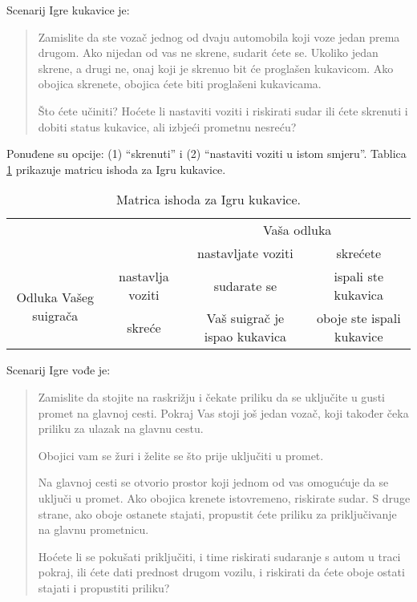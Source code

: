 \documentclass[a4paper, 12pt]{report}
\begin{document}
\begin{appendices}
Scenarij Igre kukavice je: 
\begin{quote}
Zamislite da ste vozač jednog od dvaju automobila koji voze jedan prema drugom.
Ako nijedan od vas ne skrene, sudarit ćete se. Ukoliko jedan skrene, a drugi ne,
onaj koji je skrenuo bit će proglašen kukavicom. Ako obojica skrenete, obojica
ćete biti proglašeni kukavicama.

Što ćete učiniti? Hoćete li nastaviti voziti i riskirati sudar ili ćete skrenuti
i dobiti status kukavice, ali izbjeći prometnu nesreću?
\end{quote}

Ponuđene su opcije: (1) \enquote{skrenuti} i (2) \enquote{nastaviti voziti u
    istom smjeru}. Tablica \ref{iktab} prikazuje matricu ishoda
za Igru kukavice. 

\begin{table}[h!]
\centering 
    \caption{Matrica ishoda za Igru kukavice. \label{iktab}}
\hspace*{-0.5cm}\begin{tabular}{cccc}
\toprule[1pt]
    & & \multicolumn{2}{c}{Vaša odluka}\\
        & & nastavljate voziti & skrećete\\
    \cmidrule[0.5pt]{3-4}
        \multirow{2}{*}{Odluka Vašeg suigrača} & nastavlja
            voziti & sudarate se & ispali ste kukavica  \\
        & skreće & Vaš suigrač je ispao kukavica & oboje ste
        ispali kukavice\\
	\bottomrule[1pt]
\end{tabular}
\end{table}

Scenarij Igre vođe je: 
\begin{quote}
Zamislite da stojite na raskrižju i čekate priliku da se
uključite u gusti promet na glavnoj cesti. Pokraj Vas stoji još jedan
vozač, koji također čeka priliku za ulazak na glavnu cestu. 

Obojici vam se žuri i želite se što prije uključiti u promet.

Na glavnoj cesti se otvorio prostor koji jednom od vas omogućuje da se uključi
u promet. Ako obojica krenete istovremeno, riskirate sudar. S druge strane, ako
oboje ostanete stajati, propustit ćete priliku za priključivanje na glavnu
prometnicu.

Hoćete li se pokušati priključiti, i time riskirati sudaranje s autom u traci
pokraj, ili ćete dati prednost drugom vozilu, i riskirati da ćete oboje ostati
stajati i propustiti priliku?
\end{quote}


\end{appendices}
\end{document}
